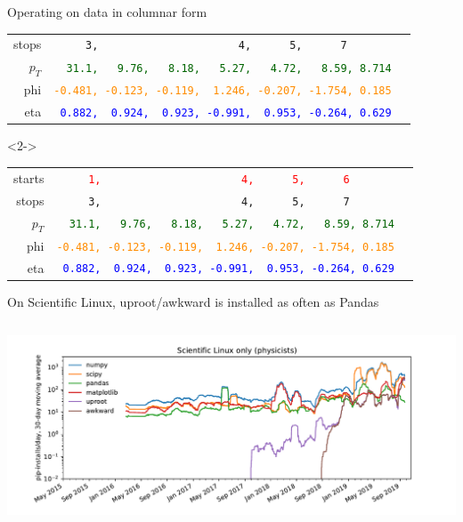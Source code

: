 \documentclass[aspectratio=169]{beamer}
\begin{document}
\begin{frame}[fragile]{Operating on data in columnar form}
\begin{onlyenv}
\begin{tabular}{r l}
\small stops   &                    {\tt\scriptsize \ \ \ \ \ 3,\ \ \ \ \ \ \ \ \ \ \ \ \ \ \ \ \ \ \ \ \ \ 4,\ \ \ \ \ \ 5,\ \ \ \ \ \ 7\ \ \ \ \ \ \ \ \ } \\
\small $p_T$ & \textcolor{darkgreen}{\tt\scriptsize \ \ 31.1,\ \ \ 9.76,\ \ \ 8.18,\ \ \ 5.27,\ \ \ 4.72,\ \ \ 8.59, 8.714} \\
\small phi &  \textcolor{darkorange}{\tt\scriptsize -0.481,\ -0.123,\ -0.119,\ \ 1.246,\ -0.207,\ -1.754,\ 0.185} \\
\small eta &        \textcolor{blue}{\tt\scriptsize \ 0.882,\ \ 0.924,\ \ 0.923,\ -0.991,\ \ 0.953,\ -0.264,\ 0.629} \\
\end{tabular}
\end{onlyenv}\begin{onlyenv}<2->
\begin{tabular}{r l}
\small starts  &     \textcolor{red}{\tt\scriptsize \ \ \ \ \ 1,\ \ \ \ \ \ \ \ \ \ \ \ \ \ \ \ \ \ \ \ \ \ 4,\ \ \ \ \ \ 5,\ \ \ \ \ \ 6\ \ \ \ \ \ \ \ \ } \\
\small stops   &                    {\tt\scriptsize \ \ \ \ \ 3,\ \ \ \ \ \ \ \ \ \ \ \ \ \ \ \ \ \ \ \ \ \ 4,\ \ \ \ \ \ 5,\ \ \ \ \ \ 7\ \ \ \ \ \ \ \ \ } \\
\small $p_T$ & \textcolor{darkgreen}{\tt\scriptsize \ \ 31.1,\ \ \ 9.76,\ \ \ 8.18,\ \ \ 5.27,\ \ \ 4.72,\ \ \ 8.59, 8.714} \\
\small phi &  \textcolor{darkorange}{\tt\scriptsize -0.481,\ -0.123,\ -0.119,\ \ 1.246,\ -0.207,\ -1.754,\ 0.185} \\
\small eta &        \textcolor{blue}{\tt\scriptsize \ 0.882,\ \ 0.924,\ \ 0.923,\ -0.991,\ \ 0.953,\ -0.264,\ 0.629} \\
\end{tabular}\end{onlyenv}
\vspace{0.25 cm}

\large
\vspace{0.2 cm}
\end{frame}

\begin{frame}{On Scientific Linux, uproot/awkward is installed as often as Pandas}
\vspace{0.5 cm}
\begin{columns}
\includegraphics[width=\linewidth]{pip-scilinux-uproot.pdf}
\end{columns}
\end{frame}
\end{document}
